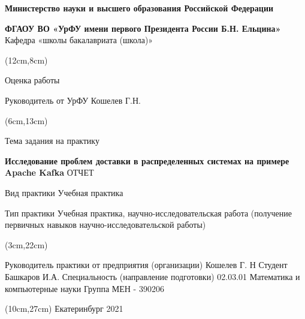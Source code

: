 \documentclass[11pt]{article}
\begin{document}
    \begin{center}
        \textbf{Министерство науки и высшего образования Российской Федерации}

        \textbf{ФГАОУ ВО «УрФУ имени первого Президента России Б.Н. Ельцина»}
        Кафедра «школы бакалавриата (школа)»
    \end{center}
    \begin{textblock*}{10cm}(12cm,8cm)
            \begin{center}
                Оценка работы \underline{\hspace{1cm}}

                Руководитель от УрФУ Кошелев Г.Н.
            \end{center}
    \end{textblock*}
    \begin{textblock*}{10cm}(6cm,13cm)

        \begin{center}
        Тема задания на практику
        \linebreak

        \textbf{Исследование проблем доставки в распределенных системах на примере Apache Kafka}
        \linebreak
        \linebreak
        ОТЧЕТ

        Вид практики Учебная практика

        Тип практики Учебная практика, научно-исследовательская работа (получение
        первичных навыков научно-исследовательской работы)
        \end{center}
    \end{textblock*}
    \begin{textblock*}{16cm}(3cm,22cm)


        \begin{flushleft}
            Руководитель практики от предприятия (организации) Кошелев Г. Н
            \linebreak\linebreak
            Студент Башкаров И.А.
            \linebreak\linebreak
            Специальность (направление подготовки) 02.03.01 Математика и компьютерные
            науки
            \linebreak\linebreak
            Группа МЕН - 390206
            \end {flushleft}
    \end{textblock*}
    \begin{textblock*}{16cm}(10cm,27cm)
        Екатеринбург 2021
    \end{textblock*}
    \pagebreak
    \pagestyle{plain} %
\end{document}
